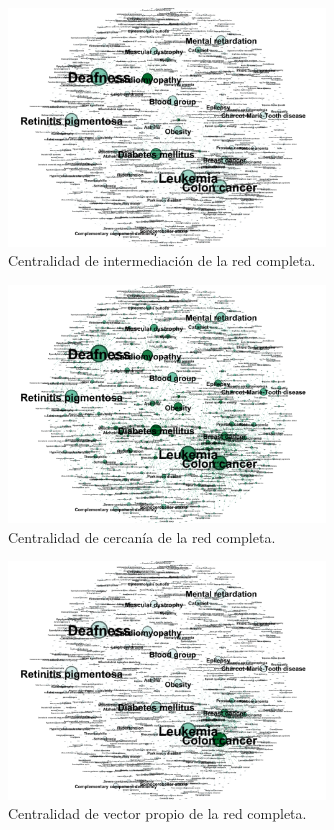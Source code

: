 \documentclass{uimppracticas}
\begin{document}
\begin{figure}[H]
	\centering
	\includegraphics[width=0.75\textwidth]{images/Betweenness-Centrality}
	\caption{Centralidad de intermediación de la red completa.}
	\label{Betweenness-Centrality}
\end{figure}

\begin{figure}[H]
	\centering
	\includegraphics[width=0.75\textwidth]{images/Closeness-Centrality}
	\caption{Centralidad de cercanía de la red completa.}
	\label{Closeness-Centrality}
\end{figure}

\begin{figure}[H]
	\centering
	\includegraphics[width=0.75\textwidth]{images/Eigenvector-Centrality}
	\caption{Centralidad de vector propio de la red completa.}
	\label{Eigenvector-Centrality}
\end{figure}

\newpage

\renewcommand{\refname}{Bibliografía}


\end{document}

